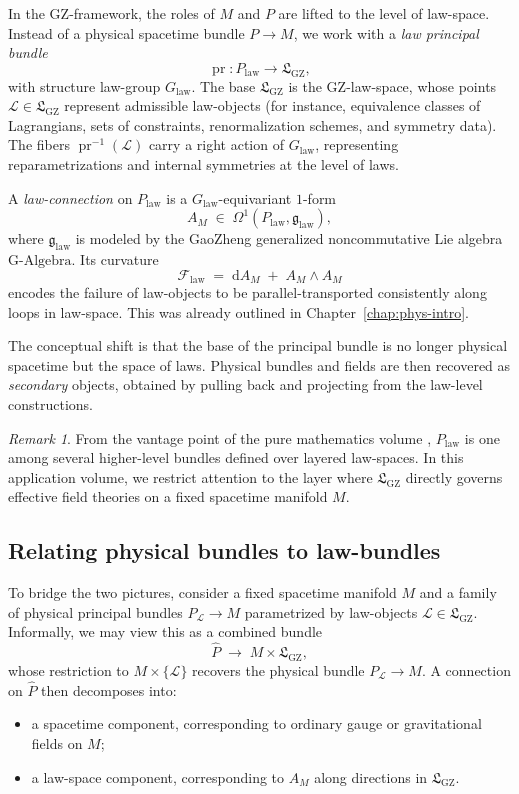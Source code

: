 \documentclass[11pt]{book}
\newcommand{\GAlgebra}{\text{G-Algebra}}
\newcommand{\GZLS}{\ensuremath{\mathfrak{L}_{\mathrm{GZ}}}}
\newcommand{\GZLOC}{\ensuremath{A_M}}
\newcommand{\GZLCurv}{\ensuremath{\mathcal{F}_{\mathrm{law}}}}
\newcommand{\Base}{\ensuremath{M}}
\newcommand{\Bundle}{\ensuremath{P}}
\newcommand{\pr}{\operatorname{pr}}
\theoremstyle{plain}
\theoremstyle{definition}
\theoremstyle{remark}
\newtheorem{remark}[theorem]{Remark}
\begin{document}
In the GZ-framework, the roles of $\Base$ and $\Bundle$ are lifted to
the level of law-space. Instead of a physical spacetime bundle
$\Bundle \to \Base$, we work with a \emph{law principal bundle}
\[
   \pr \colon \Bundle_{\mathrm{law}} \longrightarrow \GZLS,
\]
with structure law-group $G_{\mathrm{law}}$. The base $\GZLS$ is the
GZ-law-space, whose points $\mathcal{L} \in \GZLS$ represent admissible
law-objects (for instance, equivalence classes of Lagrangians, sets of
constraints, renormalization schemes, and symmetry data). The fibers
$\pr^{-1}(\mathcal{L})$ carry a right action of $G_{\mathrm{law}}$,
representing reparametrizations and internal symmetries at the level
of laws.

A \emph{law-connection} on $\Bundle_{\mathrm{law}}$ is a
$G_{\mathrm{law}}$-equivariant $1$-form
\[
   \GZLOC \;\in\; \Omega^1(\Bundle_{\mathrm{law}},\mathfrak{g}_{\mathrm{law}}),
\]
where $\mathfrak{g}_{\mathrm{law}}$ is modeled by the GaoZheng
generalized noncommutative Lie algebra $\GAlgebra$. Its curvature
\[
   \GZLCurv \;=\; \mathrm{d}\GZLOC \;+\; \GZLOC \wedge \GZLOC
\]
encodes the failure of law-objects to be parallel-transported
consistently along loops in law-space. This was already outlined in
Chapter~\ref{chap:phys-intro}.

The conceptual shift is that the base of the principal bundle is no
longer physical spacetime but the space of laws. Physical bundles and
fields are then recovered as \emph{secondary} objects, obtained by
pulling back and projecting from the law-level constructions.

\begin{remark}
  From the vantage point of the pure mathematics volume
  \cite{GaoZheng2025GFramework}, $\Bundle_{\mathrm{law}}$ is one among
  several higher-level bundles defined over layered law-spaces. In
  this application volume, we restrict attention to the layer where
  $\GZLS$ directly governs effective field theories on a fixed
  spacetime manifold $\Base$.
\end{remark}

\subsection{Relating physical bundles to law-bundles}

To bridge the two pictures, consider a fixed spacetime manifold
$\Base$ and a family of physical principal bundles
$\Bundle_{\mathcal{L}} \to \Base$ parametrized by law-objects
$\mathcal{L} \in \GZLS$. Informally, we may view this as a combined
bundle
\[
   \widehat{\Bundle} \;\longrightarrow\; \Base \times \GZLS,
\]
whose restriction to $\Base \times \{\mathcal{L}\}$ recovers the
physical bundle $\Bundle_{\mathcal{L}} \to \Base$. A connection on
$\widehat{\Bundle}$ then decomposes into:
\begin{itemize}
  \item a spacetime component, corresponding to ordinary gauge or
        gravitational fields on $\Base$;
  \item a law-space component, corresponding to $\GZLOC$ along
        directions in $\GZLS$.
\end{itemize}
\end{document}
